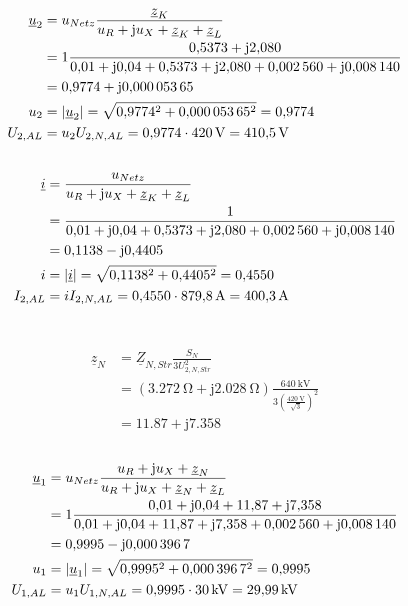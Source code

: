 \documentclass[11pt,a4paper]{scrartcl}
\DeclarePairedDelimiter{\abs}{\lvert}{\rvert}
\newcommand{\mybr}[1]{\left(#1\right)}
\renewcommand{\j}{\mathrm{j}}
\newcommand{\Z}{\underline{Z}}
\newcommand{\z}{\underline{z}}
\renewcommand{\u}{\underline{u}}
\renewcommand{\i}{\underline{i}}
\newcommand{\0}{_{\mybr{0}}}
\newcommand{\1}{_{\mybr{1}}}
\newcommand{\2}{_{\mybr{2}}}
\newcommand{\UPA}{U_{1,AL}}
\newcommand{\USA}{U_{2,AL}}
\newcommand{\ISA}{I_{2,AL}}
\newcommand{\USNS}{U_{2,N,Str}}
\newcommand{\UPNA}{U_{1,N,AL}}
\newcommand{\USNA}{U_{2,N,AL}}
\newcommand{\ISNA}{I_{2,N,AL}}
\begin{document}
\subsection{}
\begin{align}
\u_2&=u_{Netz}\frac{\z_K}{u_R+\j u_X+\z_K+\z_L}\\
&=1\frac{\num{0.5373}+\j\num{2.080}}{\num{0.01}+\j\num{0.04}+\num{0.5373}+\j\num{2.080}+\num{0.002560}+\j\num{0.008140}}\\
&=\num{0.9774}+\j\num{0.00005365}\\
u_2&=\abs{\u_2}=\sqrt{\num{0.9774}^2+\num{0.00005365}^2}=\num{0.9774}\\
\USA&=u_2\USNA=\num{0.9774}\cdot\SI{420}{\volt}=\SI{410.5}{\volt}
\end{align}

\subsection{}
\begin{align}
\i&=\frac{u_{Netz}}{u_R+\j u_X+\z_K+\z_L}\\
&=\frac{1}{\num{0.01}+\j\num{0.04}+\num{0.5373}+\j\num{2.080}+\num{0.002560}+\j\num{0.008140}}\\
&=\num{0.1138}-\j\num{0.4405}\\
i&=\abs{\i}=\sqrt{\num{0.1138}^2+\num{0.4405}^2}=\num{0.4550}\\
\ISA&=i\ISNA=\num{0.4550}\cdot\SI{879.8}{\ampere}=\SI{400.3}{\ampere}
\end{align}

\section{}
\begin{align}
\z_N&=\Z_{N,Str}\frac{S_N}{3\USNS^2}\\
&=\mybr{\SI{3.272}{\ohm}+\j\SI{2.028}{\ohm}}\frac{\SI{640}{\kilo\volt}}{3\mybr{\frac{\SI{420}{\volt}}{\sqrt{3}}}^2}\\
&=\num{11.87}+\j\num{7.358}
\end{align}

\subsection{}
\begin{align}
\u_1&=u_{Netz}\frac{u_R+\j u_X+\z_N}{u_R+\j u_X+\z_N+\z_L}\\
&=1\frac{\num{0.01}+\j\num{0.04}+\num{11.87}+\j\num{7.358}}{\num{0.01}+\j\num{0.04}+\num{11.87}+\j\num{7.358}+\num{0.002560}+\j\num{0.008140}}\\
&=\num{0.9995}-\j\num{0.0003967}\\
u_1&=\abs{\u_1}=\sqrt{\num{0.9995}^2+\num{0.0003967}^2}=\num{0.9995}\\
\UPA&=u_1\UPNA=\num{0.9995}\cdot\SI{30}{\kilo\volt}=\SI{29.99}{\kilo\volt}
\end{align}
\end{document}
